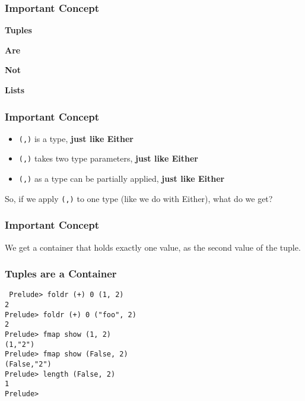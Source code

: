 \documentclass{beamer}
\begin{document}
\begin{frame}
\frametitle{Important Concept}
\begin{center}
\textbf{\Huge Tuples}

\vspace{20pt}

\textbf{\Huge Are}

\vspace{20pt}

\textbf{\Huge Not}

\vspace{20pt}

\textbf{\Huge Lists}

\end{center}
\end{frame}

\begin{frame}
\frametitle{Important Concept}
{\Large
\begin{itemize}
\item {\tt (,)} is a type, \textbf{just like Either}
\item {\tt (,)} takes two type parameters, \textbf{just like Either}
\item {\tt (,)} as a type can be partially applied, \textbf{just like Either}
\end{itemize}

\vspace{20pt}

So, if we apply {\tt (,)} to one type (like we do with Either), what do we get?
}
\end{frame}

\begin{frame}
\frametitle{Important Concept}
\begin{center}
{\Large
We get a container that holds exactly one value, as the second value of the tuple.
}
\end{center}
\end{frame}

\begin{frame}[fragile]
\frametitle{Tuples are a Container}
{\Large
{\tt
Prelude> foldr (+) 0 (1, 2) \\
2 \\
Prelude> foldr (+) 0 ("foo", 2) \\
2 \\
Prelude> fmap show (1, 2) \\
(1,"2") \\
Prelude> fmap show (False, 2) \\
(False,"2") \\
Prelude> length (False, 2) \\
1 \\
Prelude>  \\
}}
\end{frame}
\end{document}
